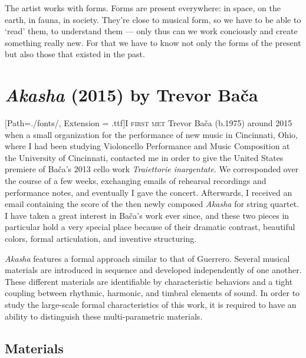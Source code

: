 \begin{savequote}[75mm]
The artist works with forms. Forms are  present everywhere: in space, on the earth, in fauna, in society. They're close to musical form, so we have to be able to `read' them, to understand them — only thus can we work conciously  and create something really new. For that we have to know not only the forms of the present but also those that existed in the past.
\end{savequote}

\chapter{\textit{Akasha} (2015) by Trevor Bača}
\label{Chapter2}

\lettrine[lines=3]{\setmainfont{GoudyInitialen}[Path=./fonts/, Extension = .ttf]\color{printGreen}I}{ first met} Trevor Ba\v{c}a (b.1975) around 2015 when a small organization for the performance of new music in Cincinnati, Ohio, where I had been studying Violoncello Performance and Music Composition at the University of Cincinnati, contacted me in order to give the United States premiere of Bača's 2013 cello work \textit{Traiettorie inargentate}. We corresponded over the course of a few weeks, exchanging emails of rehearsal recordings and performance notes, and eventually I gave the concert. Afterwards, I received an email containing the score of the then newly composed \textit{Akasha} for string quartet. I have taken a great interest in Bača's work ever since, and these two pieces in particular hold a very special place because of their dramatic contrast, beautiful colors, formal articulation, and inventive structuring.

\textit{Akasha} features a formal approach similar to that of Guerrero. Several musical materials are introduced in sequence and developed independently of one another. These different materials are identifiable by characteristic behaviors and a tight coupling between rhythmic, harmonic, and timbral elements of sound. In order to study the large-scale formal characteristics of this work, it is required to have an ability to distinguish these multi-parametric materials.

\section{Materials}

